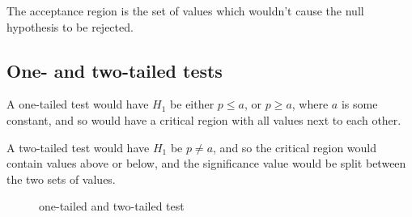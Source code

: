 The acceptance region is the set of values which wouldn't cause the null hypothesis to be rejected.
\subsection{One- and two-tailed tests}
A one-tailed test would have $H_1$ be either $p \leq a$, or $p \geq a$, where $a$ is some constant, and so would have a critical region with all values next to each other.

A two-tailed test would have $H_1$ be $p \neq a$, and so the critical region would contain values above or below, and the significance value would be split between the two sets of values.
\begin{figure}[ht]
    \centering
    \caption{one-tailed and two-tailed test}
    \label{fig:one-tailed-and-two-tailed-test}
\end{figure}
